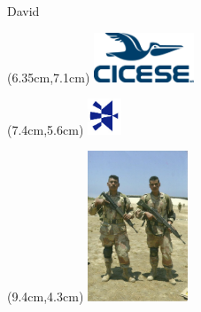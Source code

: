 \documentclass{beamer}
\begin{document}
\begin{frame}{David}
   \begin{textblock*}{\textwidth}(6.35cm,7.1cm) %
      \includegraphics[width=3.0cm]{figures/cicese_logo.png}
   \end{textblock*}
   \begin{textblock*}{\textwidth}(7.4cm,5.6cm) %
      \includegraphics[width=1.0cm]{figures/optica.jpg}
   \end{textblock*}
   \begin{textblock*}{\textwidth}(9.4cm,4.3cm) %
      \includegraphics[width=3.0cm]{figures/military.png}
   \end{textblock*}
\end{frame}
\end{document}

